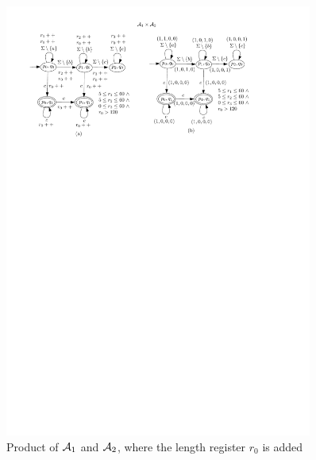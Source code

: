 \begin{figure}[ht]
  \centering
  \includegraphics[width = 0.9\textwidth]{sections/overview-cefa-product.pdf}
  \caption{Product of $\mathcal{A}_1$ and $\mathcal{A}_2$, where the length register $r_0$ is added}
  \label{fig:overview:product}
\end{figure}

